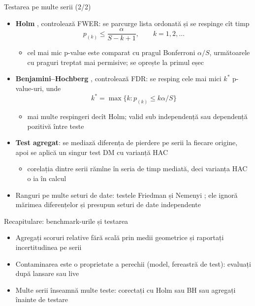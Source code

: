 \begin{frame}{Testarea pe multe serii (2/2)}
\itemsize{\small}
\begin{itemize}
    \item \textbf{Holm} , controlează FWER: se parcurge lista ordonată și se respinge cît timp \[ p_{(k)} \le \frac{\alpha}{S - k + 1}, \qquad k = 1, 2, \dots \]
    \begin{itemize}
        \item cel mai mic p-value este comparat cu pragul Bonferroni $\alpha/S$, următoarele cu praguri treptat mai permisive; se oprește la primul eșec
    \end{itemize}
    \item \textbf{Benjamini--Hochberg} , controlează FDR: se resping cele mai mici $k^*$ p-value-uri, unde \[ k^* = \max\{k: p_{(k)} \le k\alpha/S\} \]
    \begin{itemize}
        \item mai multe respingeri decît Holm; valid sub independență sau dependență pozitivă între teste
    \end{itemize}
    \item \textbf{Test agregat}: se mediază diferența de pierdere pe serii la fiecare origine, apoi se aplică un singur test DM cu varianță HAC
    \begin{itemize}
        \item corelația dintre serii rămîne în seria de timp mediată, deci varianța HAC o ia în calcul
    \end{itemize}
    \item Ranguri pe multe seturi de date: testele Friedman și Nemenyi ; ele ignoră mărimea diferențelor și presupun seturi de date independente
\end{itemize}
\end{frame}

\begin{frame}{Recapitulare: benchmark-urile și testarea}
\itemsize{\small}
\begin{itemize}
    \item Agregați scoruri relative fără scală prin medii geometrice și raportați incertitudinea pe serii
    \item Contaminarea este o proprietate a perechii (model, fereastră de test): evaluați după lansare sau live
    \item Multe serii înseamnă multe teste: corectați cu Holm sau BH sau agregați înainte de testare
\end{itemize}
\end{frame}


